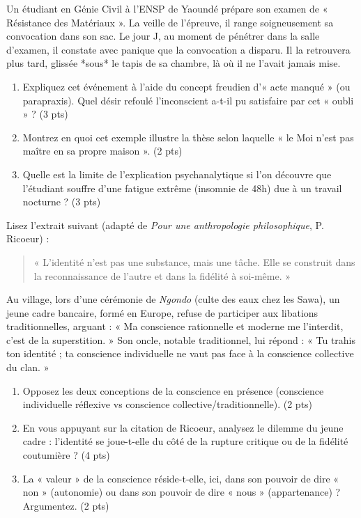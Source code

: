 \documentclass[11pt]{article}
\begin{document}
\begin{exercice}
Un étudiant en Génie Civil à l'ENSP de Yaoundé prépare son examen de « Résistance des Matériaux ». La veille de l'épreuve, il range soigneusement sa convocation dans son sac. Le jour J, au moment de pénétrer dans la salle d'examen, il constate avec panique que la convocation a disparu. Il la retrouvera plus tard, glissée *sous* le tapis de sa chambre, là où il ne l'avait jamais mise.
\begin{enumerate}
    \item Expliquez cet événement à l'aide du concept freudien d'« acte manqué » (ou parapraxis). Quel désir refoulé l'inconscient a-t-il pu satisfaire par cet « oubli » ? (3 pts)
    \item Montrez en quoi cet exemple illustre la thèse selon laquelle « le Moi n'est pas maître en sa propre maison ». (2 pts)
    \item Quelle est la limite de l'explication psychanalytique si l'on découvre que l'étudiant souffre d'une fatigue extrême (insomnie de 48h) due à un travail nocturne ? (3 pts)
\end{enumerate}
\end{exercice}

\begin{exercice}
Lisez l'extrait suivant (adapté de \textit{Pour une anthropologie philosophique}, P. Ricoeur) : 
\begin{quote}
« L'identité n'est pas une substance, mais une tâche. Elle se construit dans la reconnaissance de l'autre et dans la fidélité à soi-même. »
\end{quote}
Au village, lors d'une cérémonie de \textit{Ngondo} (culte des eaux chez les Sawa), un jeune cadre bancaire, formé en Europe, refuse de participer aux libations traditionnelles, arguant : « Ma conscience rationnelle et moderne me l'interdit, c'est de la superstition. » Son oncle, notable traditionnel, lui répond : « Tu trahis ton identité ; ta conscience individuelle ne vaut pas face à la conscience collective du clan. »
\begin{enumerate}
    \item Opposez les deux conceptions de la conscience en présence (conscience individuelle réflexive vs conscience collective/traditionnelle). (2 pts)
    \item En vous appuyant sur la citation de Ricoeur, analysez le dilemme du jeune cadre : l'identité se joue-t-elle du côté de la rupture critique ou de la fidélité coutumière ? (4 pts)
    \item La « valeur » de la conscience réside-t-elle, ici, dans son pouvoir de dire « non » (autonomie) ou dans son pouvoir de dire « nous » (appartenance) ? Argumentez. (2 pts)
\end{enumerate}
\end{exercice}
\end{document}
